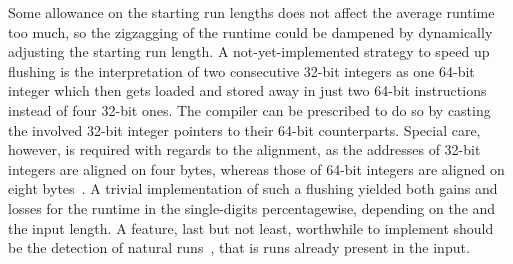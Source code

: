 Some allowance on the starting run lengths does not affect the average runtime too much, so the zigzagging of the runtime could be dampened by dynamically adjusting the starting run length.
A not-yet-implemented strategy to speed up flushing is the interpretation of two consecutive 32-bit integers as one 64-bit integer which then gets loaded and stored away in just two 64-bit instructions instead of four 32-bit ones.
The compiler can be prescribed to do so by casting the involved 32-bit integer pointers to their 64-bit counterparts.
Special care, however, is required with regards to the alignment, as the addresses of 32-bit integers are aligned on four bytes, whereas those of 64-bit integers are aligned on eight bytes~\cite[DPU ABI -- Data types]{upmemSDK}.
A trivial implementation of such a flushing yielded both gains and losses for the runtime in the single-digits percentagewise, depending on the \MS{} and the input length.
A feature, last but not least, worthwhile to implement should be the detection of natural runs~\cites[Chapter~2.6]{lang2009algorithmen}[Chapter~2.3.2]{wirth1975algorithmen}, that is runs already present in the input.

